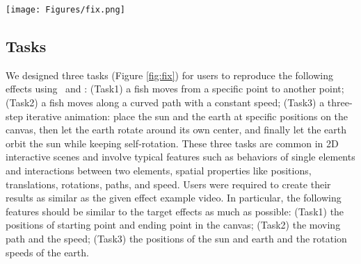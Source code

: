 
\begin{figure*}[t]
\texttt{[image: Figures/fix.png]}
  \caption{Three tasks in the comparative study.} 
  \label{fig:fix}
\end{figure*}

\subsection{Tasks} 
We designed three tasks (Figure \ref{fig:fix}) for users to reproduce the following effects using \sysName~and : (Task1) a fish moves from a specific point to another point; (Task2) a fish moves along a curved path with a constant speed; (Task3) a three-step iterative animation: place the sun and the earth {at specific positions} %
on the canvas, {then} let the earth {rotate around its own center}, %
{and finally} let the earth {orbit} %
the sun while keeping self-rotation. These three tasks are common in 2D interactive scenes and %
involve typical features such as behaviors of single elements and interactions between two elements, spatial properties like positions, translations, rotations, paths, and speed. Users were required to create their results as similar as the given effect example video. In particular, the following features should be similar to the target effects as much as possible: (Task1) the positions of starting point and ending point in the canvas; (Task2) the moving path and the speed; (Task3) the positions of the sun and earth and the rotation speeds {of the earth}.

